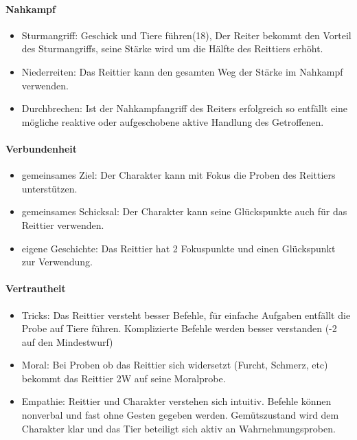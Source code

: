 \documentclass{article}
\begin{document}
\paragraph{Nahkampf}

\begin{itemize}
\item Sturmangriff: Geschick und Tiere führen(18), Der Reiter bekommt den Vorteil des Sturmangriffs, seine Stärke wird um die Hälfte des Reittiers erhöht.
\item Niederreiten: Das Reittier kann den gesamten Weg der Stärke im Nahkampf verwenden.
\item Durchbrechen: Ist der Nahkampfangriff des Reiters erfolgreich so entfällt eine mögliche reaktive oder aufgeschobene aktive Handlung des Getroffenen.
\end{itemize}

\paragraph{Verbundenheit}

\begin{itemize}
\item gemeinsames Ziel: Der Charakter kann mit Fokus die Proben des Reittiers unterstützen.
\item gemeinsames Schicksal: Der Charakter kann seine Glückspunkte auch für das Reittier verwenden.
\item eigene Geschichte: Das Reittier hat 2 Fokuspunkte und einen Glückspunkt zur Verwendung.
\end{itemize}

\paragraph{Vertrautheit}

\begin{itemize}
\item Tricks: Das Reittier versteht besser Befehle, für einfache Aufgaben entfällt die Probe auf Tiere führen. Komplizierte Befehle werden besser verstanden (-2 auf den Mindestwurf)
\item Moral: Bei Proben ob das Reittier sich widersetzt (Furcht, Schmerz, etc) bekommt das Reittier 2W auf seine Moralprobe.
\item Empathie: Reittier und Charakter verstehen sich intuitiv. Befehle können nonverbal und fast ohne Gesten gegeben werden. Gemütszustand wird dem Charakter klar und das Tier beteiligt sich aktiv an Wahrnehmungsproben.
\end{itemize}
\end{document}
